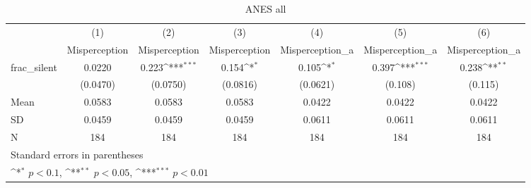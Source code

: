 \begin{table}[htbp]\centering
\def\sym#1{\ifmmode^{#1}\else\(^{#1}\)\fi}
\caption{ANES all}
\begin{tabular}{l*{6}{c}}
\hline\hline
                                &\multicolumn{1}{c}{(1)}&\multicolumn{1}{c}{(2)}&\multicolumn{1}{c}{(3)}&\multicolumn{1}{c}{(4)}&\multicolumn{1}{c}{(5)}&\multicolumn{1}{c}{(6)}\\
                                &\multicolumn{1}{c}{Misperception}&\multicolumn{1}{c}{Misperception}&\multicolumn{1}{c}{Misperception}&\multicolumn{1}{c}{Misperception\_a}&\multicolumn{1}{c}{Misperception\_a}&\multicolumn{1}{c}{Misperception\_a}\\
\hline
frac\_silent                     &   0.0220         &    0.223\sym{***}&    0.154\sym{*}  &    0.105\sym{*}  &    0.397\sym{***}&    0.238\sym{**} \\
                                & (0.0470)         & (0.0750)         & (0.0816)         & (0.0621)         &  (0.108)         &  (0.115)         \\
\hline
Mean                            &   0.0583         &   0.0583         &   0.0583         &   0.0422         &   0.0422         &   0.0422         \\
SD                              &   0.0459         &   0.0459         &   0.0459         &   0.0611         &   0.0611         &   0.0611         \\
N                               &      184         &      184         &      184         &      184         &      184         &      184         \\
\hline\hline
\multicolumn{7}{l}{\footnotesize Standard errors in parentheses}\\
\multicolumn{7}{l}{\footnotesize \sym{*} \(p<0.1\), \sym{**} \(p<0.05\), \sym{***} \(p<0.01\)}\\
\end{tabular}
\end{table}

